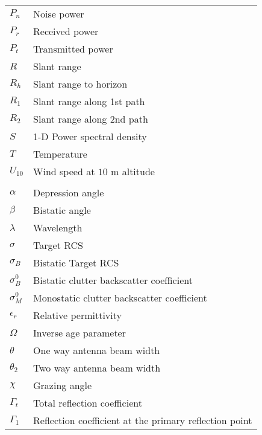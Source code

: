 \begin{supertabular}{ll}
$P_n$ & Noise power\\
$P_r$ & Received power \\
$P_t$ & Transmitted power \\
$R$ & Slant range \\
$R_h$ & Slant range to horizon \\
$R_1$ & Slant range along 1st path \\
$R_2$ & Slant range along 2nd path \\
$S$ & 1-D Power spectral density \\
$T$ & Temperature \\
$U_{10}$ & Wind speed at $10$ m altitude \\
\\
$\alpha$ & Depression angle \\
$\beta$ & Bistatic angle \\
$\lambda$ & Wavelength \\
$\sigma$ & Target RCS \\
$\sigma_B$ & Bistatic Target RCS \\
$\sigma_B^0$ & Bistatic clutter backscatter coefficient \\
$\sigma_M^0$ & Monostatic clutter backscatter coefficient \\
$\epsilon_r$ & Relative permittivity \\
$\Omega$ & Inverse age parameter \\
$\theta$ & One way antenna beam width \\
$\theta_2$ & Two way antenna beam width \\
$\chi$ & Grazing angle \\
$\Gamma_t$ & Total reflection coefficient \\
$\Gamma_1$ & Reflection coefficient at the primary reflection point \\
\end{supertabular}